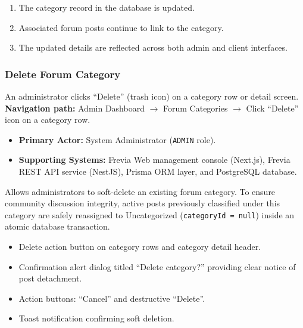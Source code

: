 \begin{enumerate}[leftmargin=1.6em,topsep=3pt,itemsep=2pt,parsep=0pt]
    \item The category record in the database is updated.
    \item Associated forum posts continue to link to the category.
    \item The updated details are reflected across both admin and client interfaces.
\end{enumerate}

\subsubsection{ Delete Forum Category}

An administrator clicks ``Delete'' (trash icon) on a category row or detail screen.\newline
\textbf{Navigation path:} Admin Dashboard $\rightarrow$ Forum Categories $\rightarrow$ Click ``Delete'' icon on a category row.


\begin{itemize}[leftmargin=1.6em,topsep=3pt,itemsep=2pt,parsep=0pt,label=$\bullet$]
    \item \textbf{Primary Actor:} System Administrator (\texttt{ADMIN} role).
    \item \textbf{Supporting Systems:} Frevia Web management console (Next.js), Frevia REST API service (NestJS), Prisma ORM layer, and PostgreSQL database.
\end{itemize}

\noindent Allows administrators to soft-delete an existing forum category. To ensure community discussion integrity, active posts previously classified under this category are safely reassigned to Uncategorized (\texttt{categoryId = null}) inside an atomic database transaction.

\begin{itemize}[leftmargin=1.6em,topsep=3pt,itemsep=2pt,parsep=0pt,label=$\bullet$]
    \item Delete action button on category rows and category detail header.
    \item Confirmation alert dialog titled ``Delete category?'' providing clear notice of post detachment.
    \item Action buttons: ``Cancel'' and destructive ``Delete''.
    \item Toast notification confirming soft deletion.
\end{itemize}

